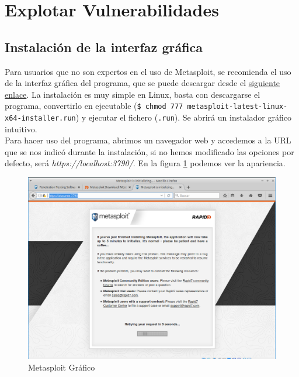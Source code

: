 \documentclass[a4,12pt,onecolum]{article}
\begin{document}

\clearpage
\section{Explotar Vulnerabilidades}


\subsection{Instalación de la interfaz gráfica}
Para usuarios que no son expertos en el uso de Metasploit, se recomienda el uso de la interfaz gráfica del programa, que se puede descargar desde el \href{https://www.rapid7.com/products/metasploit/download/}{siguiente enlace}. La instalación es muy simple en Linux, basta con descargarse el programa, convertirlo en ejecutable (\texttt{\$ chmod 777 metasploit-latest-linux-x64-installer.run}) y ejecutar el fichero (\texttt{.run}). Se abrirá un instalador gráfico intuitivo. \\

Para hacer uso del programa, abrimos un navegador web y accedemos a la URL que se nos indicó durante la instalación, si no hemos modificado las opciones por defecto, será \emph{https://localhost:3790/}. En la figura \ref{fig:meta3} podemos ver la apariencia.

\begin{figure}[htbp]
\centering
\includegraphics[width=1.0\textwidth]{./images/Atacante_metasploit_grafico.png}
\caption{Metasploit Gráfico}
\label{fig:meta3}
\end{figure}
\end{document}
